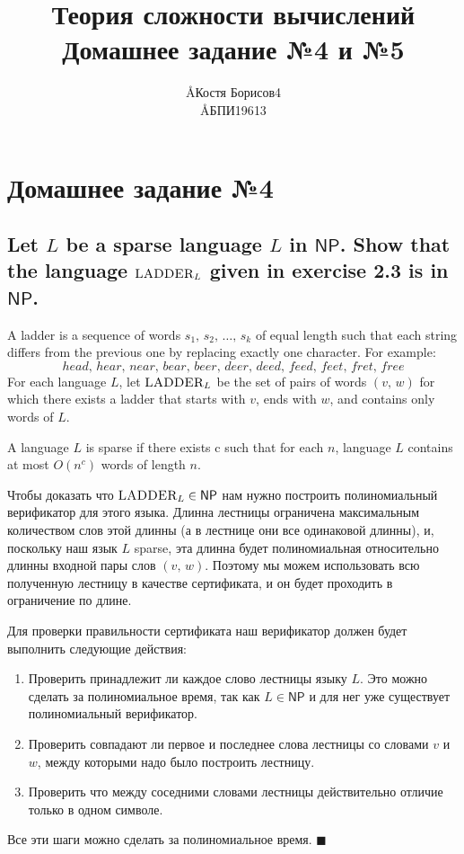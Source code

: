\documentclass{article}
\title{Теория сложности вычислений \\ Домашнее задание №4 и №5}
\author{\AA{Костя Борисов}{4} \\ \AA{БПИ196}{13}}
\newcommand{\NP}{\ensuremath{\mathsf{NP}}}
\begin{document}
  \maketitle

  \setcounter{section}{3}
  \section{Домашнее задание №4}
  \setcounter{subsection}{10}
  \subsection{Let $L$ be a sparse language $L$ in \NP. Show that the language $\textsc{LADDER}_L$ given in exercise 2.3 is in \NP.}
  \begin{centerframebox}
    A ladder is a sequence of words $s_1,\, s_2,\, \dots,\, s_k$ of equal length such that each string differs from the previous one by replacing exactly one character.
    For example: $$head,\, hear,\, near,\, bear,\, beer,\, deer,\, deed,\, feed,\, feet,\, fret,\, free$$
    For each language $L$, let $\textsc{LADDER}_L$ be the set of pairs of words $(v,\, w)$ for which there exists a ladder that starts with $v$, ends with $w$, and contains only words of $L$. \vspace{5mm}

    A language $L$ is sparse if there exists c such that for each $n$, language $L$ contains at most $O(n^c)$ words of length $n$.
  \end{centerframebox}
  Чтобы доказать что $\textsc{LADDER}_L \in \NP$ нам нужно построить полиномиальный верификатор для этого языка.
  Длинна лестницы ограничена максимальным количеством слов этой длинны (а в лестнице они все одинаковой длинны), и, поскольку наш язык $L$ sparse, эта длинна будет полиномиальная относительно длинны входной пары слов $(v,\, w)$.
  Поэтому мы можем использовать всю полученную лестницу в качестве сертификата, и он будет проходить в ограничение по длине.

  \noindent
  Для проверки правильности сертификата наш верификатор должен будет выполнить следующие действия:
  \begin{enumerate}
    \item Проверить принадлежит ли каждое слово лестницы языку $L$. Это можно сделать за полиномиальное время, так как $L \in \NP$ и для нег уже существует полиномиальный верификатор.
    \item Проверить совпадают ли первое и последнее слова лестницы со словами $v$ и $w$, между которыми надо было построить лестницу.
    \item Проверить что между соседними словами лестницы действительно отличие только в одном символе.
  \end{enumerate}
  Все эти шаги можно сделать за полиномиальное время.
  $\blacksquare$
\end{document}
